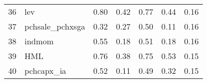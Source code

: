 \documentclass[12pt]{article}
\begin{document}
\begin{footnotesize}
\begin{longtable}{rl|c|c|c|c|c}
				36                   & lev                         & 0.80                             & 0.42                                                                                          & 0.77                                                                                          & 0.44                                                                                          & 0.16                                                                                                   \\
				37                   & pchsale\_pchxsga            & 0.32                             & 0.27                                                                                          & 0.50                                                                                          & 0.11                                                                                          & 0.16                                                                                                   \\
				38                   & indmom                      & 0.55                             & 0.18                                                                                          & 0.51                                                                                          & 0.18                                                                                          & 0.16                                                                                                   \\
				39                   & HML                         & 0.76                             & 0.38                                                                                          & 0.75                                                                                          & 0.53                                                                                          & 0.15                                                                                                   \\
				40                   & pchcapx\_ia                 & 0.52                             & 0.11                                                                                          & 0.49                                                                                          & 0.32                                                                                          & 0.15                                                                                                   \\

\end{longtable}
\end{footnotesize}
\end{document}
